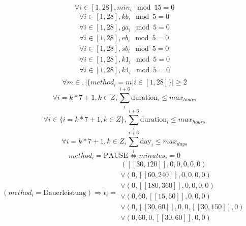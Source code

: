 \begin{equation}
    \forall i \in [1, 28], min_i \mod 15 = 0
\end{equation} 
\begin{equation}
\begin{array}{c}
    \forall i \in [1, 28], kb_i \mod 5 = 0 \\
    \forall i \in [1, 28], ga_i \mod 5 = 0 \\
    \forall i \in [1, 28], eb_i \mod 5 = 0 \\
    \forall i \in [1, 28], sb_i \mod 5 = 0 \\
    \forall i \in [1, 28], k1_i \mod 5 = 0 \\
    \forall i \in [1, 28], k4_i \mod 5 = 0 \\
\end{array}
\end{equation}
\begin{equation} 
    \forall m \in ,|\{method_i = m | i \in [1, 28]\}| \geq 2
\end{equation} 
\begin{equation}
    \forall i = k * 7 + 1, k \in Z, \sum_{i}^{i+6} \text{duration}_i \leq max_{hours} 
\end{equation}
\begin{equation}
    \forall i \in \{ i = k * 7 + 1, k \in Z \}, \sum_{i}^{i+6} \text{duration}_i \leq max_{hours}
\end{equation}
\begin{equation}
    \forall i = k * 7 + 1, k \in Z, \sum_{i}^{i+6} \text{day}_i \leq max_{days}
\end{equation}
\begin{equation}
    method_i = \text{PAUSE} \Leftrightarrow minutes_i = 0
\end{equation}
\begin{equation}
    (method_i = \text{Dauerleistung})\Rightarrow t_i = \begin{array}{c}
            ([\![30, 120]\!], 0, 0, 0, 0, 0) \\ 
            \vee (0, [\![60, 240]\!], 0, 0, 0, 0) \\  
            \vee (0, [\![180, 360]\!], 0, 0, 0, 0) \\  
            \vee (0, 60, [\![15, 60]\!], 0, 0, 0) \\  
            \vee (0, [\![30, 60]\!], 0, 0, [\![30, 150]\!], 0) \\    
            \vee (0, 60, 0, [\![30, 60]\!], 0, 0) \\  
    \end{array}
\end{equation}
